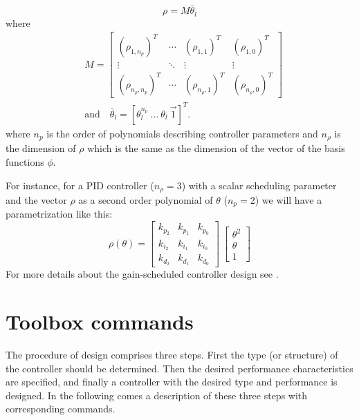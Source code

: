 \documentclass [12pt , a4paper] {report}
\begin{document}
\[
\rho=M\bar{\theta}_l
\]
where
\begin{align}
\label{eq:GS}
& M=\left[ \begin{array}{cccc}
(\rho_{1,n_p})^T & \cdots & (\rho_{1,1})^T & (\rho_{1,0})^T \\ [.25 cm]
 \vdots & \ddots & \vdots & \vdots \\ [.25 cm]
(\rho_{n_\rho,n_p})^T & \cdots & (\rho_{n_\rho,1})^T & (\rho_{n_\rho,0})^T \end{array} \right] \\
& \mbox{and} \quad \bar{\theta}_l=[\theta_l^{n_p}\:  \ldots \: \theta_l \: \overrightarrow{1}]^T. \nonumber 
\end{align}
where $n_p$ is the order of polynomials describing controller parameters and $n_\rho$ is the dimension of $\rho$ which is the same as the dimension of the vector of the basis functions $\phi$.

For instance, for a PID controller ($n_\rho=3$) with a scalar scheduling parameter and the vector $\rho$ as a second order polynomial of $\theta$ ($n_p=2$) we will have a parametrization like this:
\begin{equation}
\label{eq:GSPID}
\rho(\theta)=\left[ \begin{array}{ccc}
k_{p_2} & k_{p_1} & k_{p_0} \\ [.25 cm]
k_{i_2} & k_{i_1} & k_{i_0} \\ [.25 cm]
k_{d_2} & k_{d_1} & k_{d_0} \end{array} \right] \: \left[ \begin{array}{c}
\theta^2 \\ [.25 cm]
 \theta \\ [.25 cm]
1 \end{array} \right] 
\end{equation}
For more details about the gain-scheduled controller design see \cite{KKL07e}.

\chapter{Toolbox commands}
The procedure of design comprises three steps. First the type (or structure) of the controller should be determined. Then the desired performance characteristics are specified, and finally a controller with the desired type and performance is designed. In the following comes a description of these three steps with corresponding commands.
\end{document}

